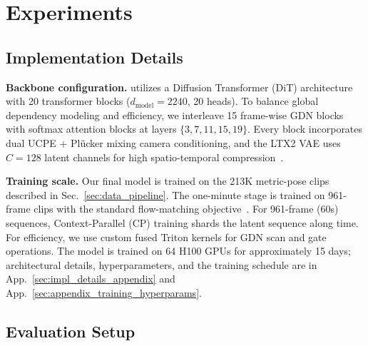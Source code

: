 \section{Experiments}
\label{sec:experiments}


\subsection{Implementation Details}
\label{sec:impl_details}

\noindent\textbf{Backbone configuration.}
\modelname utilizes a Diffusion Transformer (DiT) architecture with 20 transformer blocks ($d_\text{model}{=}2240$, 20 heads). To balance global dependency modeling and efficiency, we interleave 15 frame-wise GDN blocks with softmax attention blocks at layers $\{3,7,11,15,19\}$. Every block incorporates dual UCPE + Pl\"ucker mixing camera conditioning, and the LTX2 VAE uses $C{=}128$ latent channels for high spatio-temporal compression~\citep{dit,gated_deltanet,ucpe,plucker_lfn,ltx2}.

\noindent\textbf{Training scale.}
Our final model is trained on the 213K metric-pose clips described in Sec.~\ref{sec:data_pipeline}. 
The one-minute stage is trained on 961-frame clips with the standard flow-matching objective~\citep{flow_matching}. 
For 961-frame (60s) sequences, Context-Parallel (CP) training shards the latent sequence along time. 
For efficiency, we use custom fused Triton kernels for GDN scan and gate operations. 
The model is trained on 64 H100 GPUs for approximately 15 days; architectural details, hyperparameters, and the training schedule are in App.~\ref{sec:impl_details_appendix} and App.~\ref{sec:appendix_training_hyperparams}.



\subsection{Evaluation Setup}
\label{sec:eval_setup}




